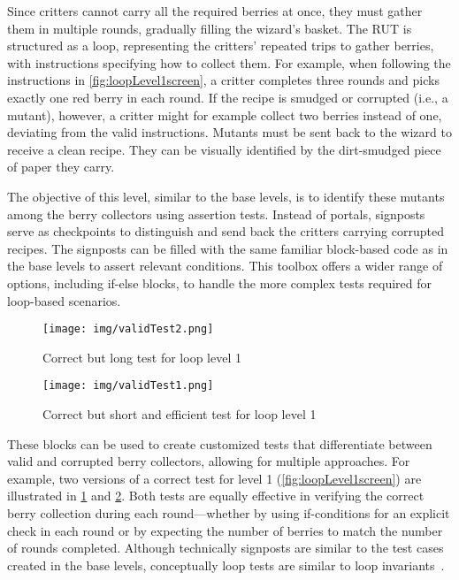 Since critters cannot carry all the required berries at once, they must gather them in multiple rounds, gradually filling the wizard's basket. The RUT is structured as a loop, representing the critters' repeated trips to gather berries, with instructions specifying how to collect them. For example, when following the instructions in \cref{fig:loopLevel1screen}, a critter completes three rounds and picks exactly one red berry in each round. If the recipe is smudged or corrupted (i.e., a mutant), however, a critter might for example collect two berries instead of one, deviating from the valid instructions. Mutants must be sent back to the wizard to receive a clean recipe. They can be visually identified by the dirt-smudged piece of paper they carry.

The objective of this level, similar to the base levels, is to identify these mutants among the berry collectors using assertion tests. Instead of portals, signposts serve as checkpoints to distinguish and send back the critters carrying corrupted recipes. The signposts can be filled with the same familiar block-based code as in the base levels to assert relevant conditions. This toolbox offers a wider range of options, including if-else blocks, to handle the more complex tests required for loop-based scenarios.

\begin{figure}
	\centering
	\texttt{[image: img/validTest2.png]}
	\caption{Correct but long test for loop level 1}
	\label{fig:validTestLong}
\end{figure}

\begin{figure}
	\centering
	\texttt{[image: img/validTest1.png]}
	\caption{Correct but short and efficient test for loop level 1}
	\label{fig:validTestShort}
\end{figure}

These blocks can be used to create customized tests that differentiate between valid and corrupted berry collectors, allowing for multiple approaches. For example, two versions of a correct test for level 1 (\cref{fig:loopLevel1screen}) are illustrated in \cref{fig:validTestLong} and \cref{fig:validTestShort}. Both tests are equally effective in verifying the correct berry collection during each round—whether by using if-conditions for an explicit check in each round or by expecting the number of berries to match the number of rounds completed. Although technically signposts are similar to the test cases created in the base levels, conceptually loop tests are similar to loop invariants~\cite{DBLP:journals/csur/FuriaMV14}. 

